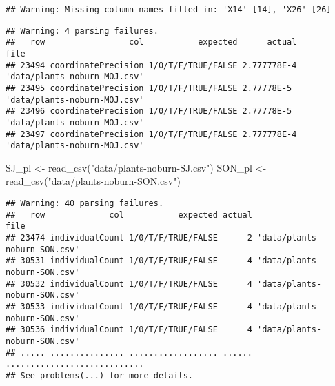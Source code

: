 \documentclass[
]{article}
\newenvironment{Shaded}{\begin{snugshade}}{\end{snugshade}}
\newcommand{\FunctionTok}[1]{\textcolor[rgb]{0.00,0.00,0.00}{#1}}
\newcommand{\NormalTok}[1]{#1}
\newcommand{\OtherTok}[1]{\textcolor[rgb]{0.56,0.35,0.01}{#1}}
\newcommand{\StringTok}[1]{\textcolor[rgb]{0.31,0.60,0.02}{#1}}
\begin{document}
\begin{verbatim}
## Warning: Missing column names filled in: 'X14' [14], 'X26' [26]
\end{verbatim}

\begin{verbatim}
## Warning: 4 parsing failures.
##   row                 col           expected      actual                         file
## 23494 coordinatePrecision 1/0/T/F/TRUE/FALSE 2.777778E-4 'data/plants-noburn-MOJ.csv'
## 23495 coordinatePrecision 1/0/T/F/TRUE/FALSE 2.77778E-5  'data/plants-noburn-MOJ.csv'
## 23496 coordinatePrecision 1/0/T/F/TRUE/FALSE 2.77778E-5  'data/plants-noburn-MOJ.csv'
## 23497 coordinatePrecision 1/0/T/F/TRUE/FALSE 2.777778E-4 'data/plants-noburn-MOJ.csv'
\end{verbatim}

\begin{Shaded}
\begin{Highlighting}[]
\NormalTok{SJ\_pl }\OtherTok{\textless{}{-}} \FunctionTok{read\_csv}\NormalTok{(}\StringTok{"data/plants{-}noburn{-}SJ.csv"}\NormalTok{)}
\NormalTok{SON\_pl }\OtherTok{\textless{}{-}} \FunctionTok{read\_csv}\NormalTok{(}\StringTok{"data/plants{-}noburn{-}SON.csv"}\NormalTok{)}
\end{Highlighting}
\end{Shaded}

\begin{verbatim}
## Warning: 40 parsing failures.
##   row             col           expected actual                         file
## 23474 individualCount 1/0/T/F/TRUE/FALSE      2 'data/plants-noburn-SON.csv'
## 30531 individualCount 1/0/T/F/TRUE/FALSE      4 'data/plants-noburn-SON.csv'
## 30532 individualCount 1/0/T/F/TRUE/FALSE      4 'data/plants-noburn-SON.csv'
## 30533 individualCount 1/0/T/F/TRUE/FALSE      4 'data/plants-noburn-SON.csv'
## 30536 individualCount 1/0/T/F/TRUE/FALSE      4 'data/plants-noburn-SON.csv'
## ..... ............... .................. ...... ............................
## See problems(...) for more details.
\end{verbatim}
\end{document}
